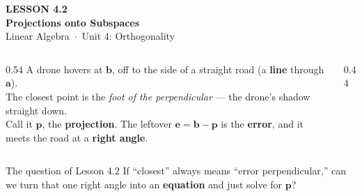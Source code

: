\documentclass[aspectratio=169, 11pt]{beamer}
\newcommand{\bb}{\mathbf{b}}
\newcommand{\pp}{\mathbf{p}}
\newcommand{\ee}{\mathbf{e}}
\newcommand{\avec}{\mathbf{a}}
\begin{document}
{
\begin{frame}[plain]
  \vspace{2.8cm}\hspace{0.55cm}%
  \begin{minipage}{0.9\textwidth}
    {\color{goldacc}\bfseries\small LESSON 4.2}\\[0.5cm]
    {\color{white}\bfseries\LARGE Projections onto Subspaces}\\[1.0cm]
    {\color{blushmid}\small Linear Algebra~$\cdot$~Unit 4: Orthogonality}
  \end{minipage}
\end{frame}
}

\begin{frame}[t, plain]
  \begin{columns}[T]
    \begin{column}{0.54\textwidth}
      A drone hovers at $\bb$, off to the side of a straight road (a \textbf{line} through $\avec$).\\[6pt]
      The closest point is the \emph{foot of the perpendicular} --- the drone's shadow straight down.\\[8pt]
      Call it $\pp$, the \textbf{projection}. The leftover $\ee=\bb-\pp$ is the \textbf{error}, and it
      meets the road at a \textbf{right angle}.
    \end{column}
    \begin{column}{0.44\textwidth}
      \centering
    \end{column}
  \end{columns}
  \vspace{4pt}
  \begin{block}{The question of Lesson 4.2}
    If ``closest'' always means ``error perpendicular,'' can we turn that one right angle into an
    \textbf{equation} and just solve for $\pp$?
  \end{block}
\end{frame}
\end{document}
